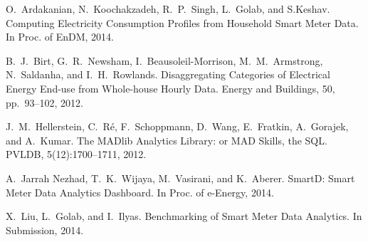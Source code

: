 \documentclass{sig-alternate}
\begin{document}
\raggedright
\flushleft
\begin{thebibliography}{20}
{\small
{}
O.~Ardakanian, N.~Koochakzadeh, R.~P.~Singh, L.~Golab, and S.Keshav. Computing Electricity Consumption Profiles from Household Smart Meter Data. In Proc. of EnDM, 2014.

B.~J.~Birt, G.~R.~Newsham,  I.~Beausoleil-Morrison, M.~M.~Armstrong,  N.~Saldanha, and I.~H.~Rowlands. Disaggregating Categories of Electrical Energy End-use from Whole-house Hourly Data. Energy and Buildings, 50, pp.~93--102, 2012.

 J.~M.~Hellerstein, C.~R\'{e}, F.~Schoppmann, D.~Wang, E.~Fratkin, A.~Gorajek, and A.~Kumar. The MADlib Analytics Library: or MAD Skills, the SQL. PVLDB, 5(12):1700--1711, 2012.

A.~Jarrah Nezhad, T.~K.~Wijaya, M.~Vasirani, and K.~Aberer.  SmartD: Smart Meter Data Analytics Dashboard. In Proc. of e-Energy, 2014.

X.~Liu, L.~Golab,  and I.~Ilyas. Benchmarking of Smart Meter Data Analytics. In Submission, 2014.

}

\end{thebibliography}
\end{document}
